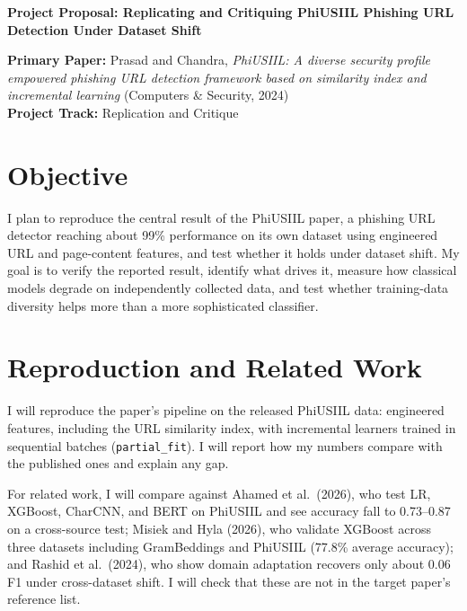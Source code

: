 \documentclass[10pt]{article}
\begin{document}
\begin{center}
{\large\bfseries Project Proposal: Replicating and Critiquing PhiUSIIL Phishing URL Detection Under Dataset Shift}
\end{center}
\vspace{-4pt}

\textbf{Primary Paper:} Prasad and Chandra, \emph{PhiUSIIL: A diverse security profile empowered phishing URL detection framework based on similarity index and incremental learning} (Computers \& Security, 2024)\\
\textbf{Project Track:} Replication and Critique

\section{Objective}
I plan to reproduce the central result of the PhiUSIIL paper, a phishing URL detector reaching about 99\% performance on its own dataset using engineered URL and page-content features, and test whether it holds under dataset shift. My goal is to verify the reported result, identify what drives it, measure how classical models degrade on independently collected data, and test whether training-data diversity helps more than a more sophisticated classifier.

\section{Reproduction and Related Work}
I will reproduce the paper's pipeline on the released PhiUSIIL data: engineered features, including the URL similarity index, with incremental learners trained in sequential batches (\texttt{partial\_fit}). I will report how my numbers compare with the published ones and explain any gap.

For related work, I will compare against Ahamed et al.\ (2026), who test LR, XGBoost, CharCNN, and BERT on PhiUSIIL and see accuracy fall to 0.73--0.87 on a cross-source test; Misiek and Hyla (2026), who validate XGBoost across three datasets including GramBeddings and PhiUSIIL (77.8\% average accuracy); and Rashid et al.\ (2024), who show domain adaptation recovers only about 0.06 F1 under cross-dataset shift. I will check that these are not in the target paper's reference list.
\end{document}
